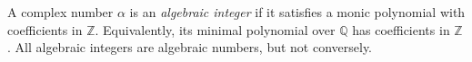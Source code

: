 
A complex number $\alpha$ is an \emph{algebraic integer} if it satisfies a monic polynomial with coefficients in $\mathbb Z$. Equivalently, its minimal polynomial over $\mathbb Q$ has coefficients in $\mathbb Z$. All algebraic integers are algebraic numbers, but not conversely.
